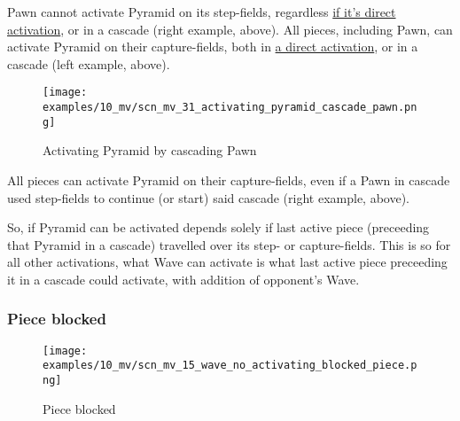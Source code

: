Pawn cannot activate Pyramid on its step-fields, regardless
\hyperref[fig:scn_ma_04_pyramid_activation_by_pawn]{if it's direct activation}, or in a cascade
(right example, above). All pieces, including Pawn, can activate Pyramid on their capture-fields,
both in \hyperref[fig:scn_ma_01_pyramid_activation_init]{a direct activation}, or in a cascade
(left example, above).

\clearpage %

\vspace*{-2.1\baselineskip}
\noindent
\begin{figure}[!h]
\texttt{[image: examples/10\_mv/scn\_mv\_31\_activating\_pyramid\_cascade\_pawn.png]}
\vspace*{-1.3\baselineskip}
\caption{Activating Pyramid by cascading Pawn}
\label{fig:scn_mv_31_activating_pyramid_cascade_pawn}
\end{figure}

\vspace*{-0.3\baselineskip}
All pieces can activate Pyramid on their capture-fields, even if a Pawn in cascade used
step-fields to continue (or start) said cascade (right example, above).

So, if Pyramid can be activated depends solely if last active piece (preceeding that Pyramid
in a cascade) travelled over its step- or capture-fields. This is so for all other activations,
what Wave can activate is what last active piece preceeding it in a cascade could activate,
with addition of opponent's Wave.

\clearpage %

\subsubsection*{Piece blocked}

\vspace*{-3.0ex}
\noindent
\begin{figure}[h]
\texttt{[image: examples/10\_mv/scn\_mv\_15\_wave\_no\_activating\_blocked\_piece.png]}
\caption{Piece blocked}
\label{fig:scn_mv_15_wave_no_activating_blocked_piece}
\end{figure}

